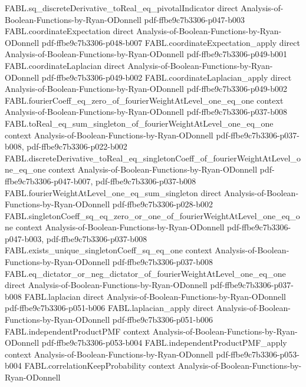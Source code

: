 \begin{theorem}
\proofstep
  {FABL.sq_discreteDerivative_toReal_eq_pivotalIndicator}
  {direct}
  {Analysis-of-Boolean-Functions-by-Ryan-ODonnell}
  {pdf-ffbe9c7b3306-p047-b003}
\proofstep
  {FABL.coordinateExpectation}
  {direct}
  {Analysis-of-Boolean-Functions-by-Ryan-ODonnell}
  {pdf-ffbe9c7b3306-p048-b007}
\proofstep
  {FABL.coordinateExpectation_apply}
  {direct}
  {Analysis-of-Boolean-Functions-by-Ryan-ODonnell}
  {pdf-ffbe9c7b3306-p049-b001}
\proofstep
  {FABL.coordinateLaplacian}
  {direct}
  {Analysis-of-Boolean-Functions-by-Ryan-ODonnell}
  {pdf-ffbe9c7b3306-p049-b002}
\proofstep
  {FABL.coordinateLaplacian_apply}
  {direct}
  {Analysis-of-Boolean-Functions-by-Ryan-ODonnell}
  {pdf-ffbe9c7b3306-p049-b002}
\proofstep
  {FABL.fourierCoeff_eq_zero_of_fourierWeightAtLevel_one_eq_one}
  {context}
  {Analysis-of-Boolean-Functions-by-Ryan-ODonnell}
  {pdf-ffbe9c7b3306-p037-b008}
\proofstep
  {FABL.toReal_eq_sum_singleton_of_fourierWeightAtLevel_one_eq_one}
  {context}
  {Analysis-of-Boolean-Functions-by-Ryan-ODonnell}
  {pdf-ffbe9c7b3306-p037-b008,
    pdf-ffbe9c7b3306-p022-b002}
\proofstep
  {FABL.discreteDerivative_toReal_eq_singletonCoeff_of_fourierWeightAtLevel_one_eq_one}
  {context}
  {Analysis-of-Boolean-Functions-by-Ryan-ODonnell}
  {pdf-ffbe9c7b3306-p047-b007,
    pdf-ffbe9c7b3306-p037-b008}
\proofstep
  {FABL.fourierWeightAtLevel_one_eq_sum_singleton}
  {direct}
  {Analysis-of-Boolean-Functions-by-Ryan-ODonnell}
  {pdf-ffbe9c7b3306-p028-b002}
\proofstep
  {FABL.singletonCoeff_sq_eq_zero_or_one_of_fourierWeightAtLevel_one_eq_one}
  {context}
  {Analysis-of-Boolean-Functions-by-Ryan-ODonnell}
  {pdf-ffbe9c7b3306-p047-b003,
    pdf-ffbe9c7b3306-p037-b008}
\proofstep
  {FABL.exists_unique_singletonCoeff_sq_eq_one}
  {context}
  {Analysis-of-Boolean-Functions-by-Ryan-ODonnell}
  {pdf-ffbe9c7b3306-p037-b008}
\proofstep
  {FABL.eq_dictator_or_neg_dictator_of_fourierWeightAtLevel_one_eq_one}
  {direct}
  {Analysis-of-Boolean-Functions-by-Ryan-ODonnell}
  {pdf-ffbe9c7b3306-p037-b008}
\proofstep
  {FABL.laplacian}
  {direct}
  {Analysis-of-Boolean-Functions-by-Ryan-ODonnell}
  {pdf-ffbe9c7b3306-p051-b006}
\proofstep
  {FABL.laplacian_apply}
  {direct}
  {Analysis-of-Boolean-Functions-by-Ryan-ODonnell}
  {pdf-ffbe9c7b3306-p051-b006}
\proofstep
  {FABL.independentProductPMF}
  {context}
  {Analysis-of-Boolean-Functions-by-Ryan-ODonnell}
  {pdf-ffbe9c7b3306-p053-b004}
\proofstep
  {FABL.independentProductPMF_apply}
  {context}
  {Analysis-of-Boolean-Functions-by-Ryan-ODonnell}
  {pdf-ffbe9c7b3306-p053-b004}
\proofstep
  {FABL.correlationKeepProbability}
  {context}
  {Analysis-of-Boolean-Functions-by-Ryan-ODonnell}

\end{theorem}
